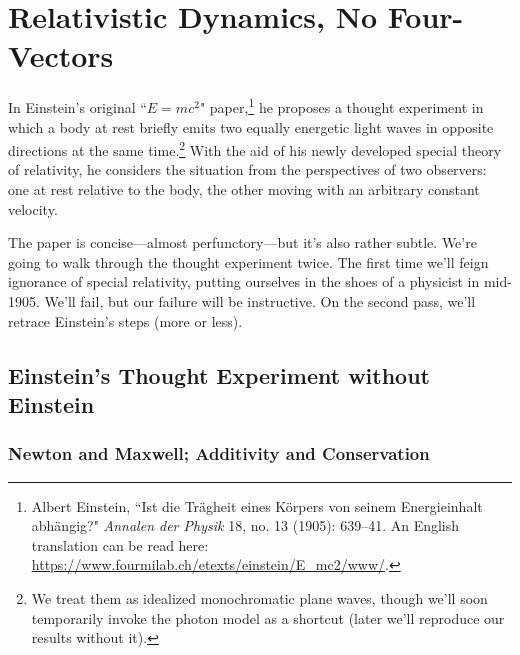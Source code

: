 \documentclass[12pt]{article}
\begin{document}
\printnomenclature

\clearpage


\section{Relativistic Dynamics, No Four-Vectors}\label{sec:rd}


In Einstein's original ``$E=mc^2$" paper,\footnote{Albert Einstein, ``Ist die Tr\"agheit eines K\"orpers von seinem Energieinhalt abh\"angig?" \emph{Annalen der Physik} 18, no. 13 (1905): 639--41. An English translation can be read here: \url{https://www.fourmilab.ch/etexts/einstein/E_mc2/www/}.} he proposes a thought experiment in which a body at rest briefly emits two equally energetic light waves in opposite directions at the same time.\footnote{We treat them as idealized monochromatic plane waves, though we'll soon temporarily invoke the photon model as a shortcut (later we'll reproduce our results without it).} With the aid of his newly developed special theory of relativity, he considers the situation from the perspectives of two observers: one at rest relative to the body, the other moving with an arbitrary constant velocity.
 
The paper is concise---almost perfunctory---but it's also rather subtle. We're going to walk through the thought experiment twice. The first time we'll feign ignorance of special relativity, putting ourselves in the shoes of a physicist in mid-1905. We'll fail, but our failure will be instructive. On the second pass, we'll retrace Einstein's steps (more or less).


\subsection[Einstein’s Thought Experiment without Einstein]{Einstein's Thought Experiment without Einstein}
 
\subsubsection{Newton and Maxwell; Additivity and Conservation}
\end{document}
